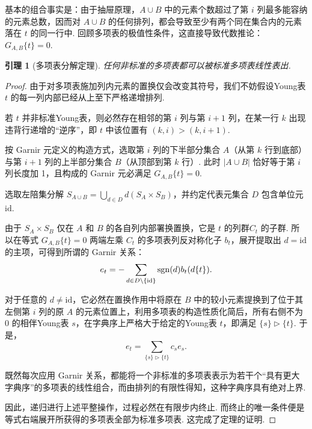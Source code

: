 \documentclass{sjtureport}
\newtheorem{lemma}[theorem]{引理}
\begin{document}
基本的组合事实是：由于抽屉原理，$A \cup B$ 中的元素个数超过了第 $i$ 列最多能容纳的元素总数，因而对 $A \cup B$ 的任何排列，都会导致至少有两个同在集合内的元素落在 $t$ 的同一行中. 回顾多项表的极值性条件，这直接导致代数推论：$G_{A,B} \{t\} = 0$.

\begin{lemma}[多项表分解定理]
    任何非标准的多项表都可以被标准多项表线性表出.
\end{lemma}
\begin{proof}
    由于对多项表施加列内元素的置换仅会改变其符号，我们不妨假设Young表 $t$ 的每一列内部已经从上至下严格递增排列.\par
    若 $t$ 并非标准Young表，则必然存在相邻的第 $i$ 列与第 $i+1$ 列，在某一行 $k$ 出现违背行递增的“逆序”，即 $t$ 中该位置有 $(k, i) > (k, i+1)$.\par
    按 Garnir 元定义的构造方式，选取第 $i$ 列的下半部分集合 $A$（从第 $k$ 行到底部）与第 $i+1$ 列的上半部分集合 $B$（从顶部到第 $k$ 行）. 此时 $|A \cup B|$ 恰好等于第 $i$ 列长度加 1，且构成的 Garnir 元必满足 $G_{A,B}\{t\} = 0$.\par
    
    选取左陪集分解 $S_{A \cup B} = \bigcup_{d \in D} d (S_A \times S_B)$，并约定代表元集合 $D$ 包含单位元 $\mathrm{id}$.\par
    由于 $S_A \times S_B$ 仅在 $A$ 和 $B$ 的各自列内部署换置换，它是 $t$ 的列群$C_t$ 的子群. 所以在等式 $G_{A,B}\{t\} = 0$ 两端左乘 $C_t$ 的多项表列反对称化子 $b_t$，展开提取出 $d = \mathrm{id}$ 的主项，可得到所谓的 Garnir 关系：
    \begin{equation*}
        e_t = -\sum_{d \in D \setminus \{\mathrm{id}\}} \mathrm{sgn}(d) b_t \qty(d\{t\}).
    \end{equation*}
    
    对于任意的 $d \neq \mathrm{id}$，它必然在置换作用中将原在 $B$ 中的较小元素提换到了位于其左侧第 $i$ 列的原 $A$ 的元素位置上，利用多项表的构造性质化简后，所有右侧不为 $0$ 的相伴Young表 $s$，在字典序上严格大于给定的Young表 $t$，即满足 $\{s\} \rhd \{t\}$. 于是，
    \begin{equation*}
        e_t = \sum_{\{s\} \rhd \{t\}} c_s e_s.
    \end{equation*}
    
    既然每次应用 Garnir 关系，都能将一个非标准的多项表表示为若干个“具有更大字典序”的多项表的线性组合，而由排列的有限性得知，这种字典序具有绝对上界.\par
    因此，递归进行上述平整操作，过程必然在有限步内终止. 而终止的唯一条件便是等式右端展开所获得的多项表全部为标准多项表. 这完成了定理的证明.
\end{proof}
\end{document}
